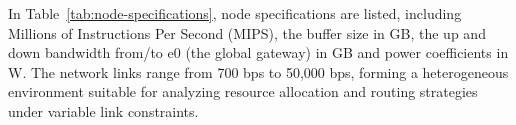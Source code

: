 \documentclass[preprint,12pt]{elsarticle}
\begin{document}
In Table~\ref{tab:node-specifications}, node specifications are listed, including Millions of Instructions Per Second (MIPS), the buffer size in GB, the up and down bandwidth from/to e0 (the global gateway) in GB and power coefficients in W. The network links range from 700 bps to 50,000 bps, forming a heterogeneous environment suitable for analyzing resource allocation and routing strategies under variable link constraints.


\begin{table}[h!]
\centering
\caption{Detailed Specifications of Nodes}
\label{tab:node-specifications}
\end{table}
\end{document}
